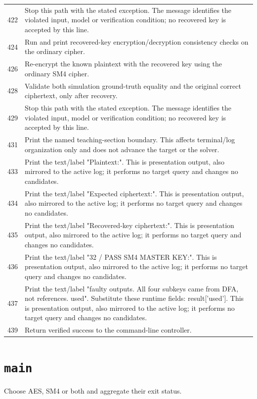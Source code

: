 \begin{longtable}{r >{\raggedright\arraybackslash}p{138mm}}
422&Stop this path with the stated exception. The message identifies the violated input, model or verification condition; no recovered key is accepted by this line.\\
424&Run and print recovered-key encryption/decryption consistency checks on the ordinary cipher.\\
426&Re-encrypt the known plaintext with the recovered key using the ordinary SM4 cipher.\\
428&Validate both simulation ground-truth equality and the original correct ciphertext, only after recovery.\\
429&Stop this path with the stated exception. The message identifies the violated input, model or verification condition; no recovered key is accepted by this line.\\
431&Print the named teaching-section boundary. This affects terminal/log organization only and does not advance the target or the solver.\\
433&Print the text/label "Plaintext:". This is presentation output, also mirrored to the active log; it performs no target query and changes no candidates.\\
434&Print the text/label "Expected ciphertext:". This is presentation output, also mirrored to the active log; it performs no target query and changes no candidates.\\
435&Print the text/label "Recovered-key ciphertext:". This is presentation output, also mirrored to the active log; it performs no target query and changes no candidates.\\
436&Print the text/label "32  / PASS SM4 MASTER KEY:". This is presentation output, also mirrored to the active log; it performs no target query and changes no candidates.\\
437&Print the text/label "faulty outputs. All four subkeys came from DFA, not references. used". Substitute these runtime fields: result['used']. This is presentation output, also mirrored to the active log; it performs no target query and changes no candidates.\\
439&Return verified success to the command-line controller.\\
\bottomrule\end{longtable}\endgroup
\section{\texttt{main}}
Choose AES, SM4 or both and aggregate their exit status.
\begin{center}\end{center}
